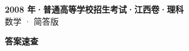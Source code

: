 \documentclass[zihao=-4, a4paper]{ctexart}
\begin{document}
\begin{center}
  {\Large\bfseries 2008 年·普通高等学校招生考试·江西卷·理科}\\[4pt]
  {\large 数学 · 简答版}
\end{center}
\medskip
{}

\clearpage
{}
\begin{center}{\Large\bfseries 答案速查}\end{center}
\medskip

\end{document}
